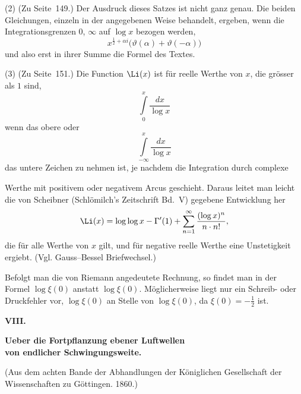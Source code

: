 \documentclass[12pt,a4paper]{book}
\theoremstyle{definition}
\theoremstyle{remark}
\begin{document}
\smallskip
\noindent (2) (Zu Seite~149.) Der Ausdruck dieses Satzes ist nicht ganz genau. Die beiden Gleichungen, einzeln in der angegebenen Weise behandelt, ergeben, wenn die Integrationsgrenzen $0$, $\infty$ auf $\log x$ bezogen werden,
\[
x^{\frac{1}{2}+\alpha i}\bigl(\vartheta(\alpha) + \vartheta(-\alpha)\bigr)
\]
und also erst in ihrer Summe die Formel des Textes.

\smallskip
\noindent (3) (Zu Seite~151.) Die Function $\Li(x)$ ist f\"ur reelle Werthe von $x$, die gr\"osser als $1$ sind,
\[
\int\limits_{0}^{x}\frac{dx}{\log x}
\]
 wenn das obere oder
\[
\int\limits_{-\infty}^{x}\frac{dx}{\log x}
\]
 das untere Zeichen zu nehmen ist, je nachdem die Integration durch complexe

Werthe mit positivem oder negativem Arcus geschieht. Daraus leitet man leicht die von Scheibner (Schl\"omilch's Zeitschrift Bd.~V) gegebene Entwicklung her
\[
\Li(x) = \log\log x - \Gamma'(1) + \sum_{n=1}^{\infty}\frac{(\log x)^{n}}{n\cdot n!},
\]
die f\"ur alle Werthe von $x$ gilt, und f\"ur negative reelle Werthe eine Unstetigkeit ergiebt. (Vgl. Gauss--Bessel Briefwechsel.)

Befolgt man die von Riemann angedeutete Rechnung, so findet man in der Formel $\log\xi(0)$ anstatt $\log\xi(0)$. M\"oglicherweise liegt nur ein Schreib- oder Druckfehler vor, $\log\xi(0)$ an Stelle von $\log\xi(0)$, da $\xi(0) = -\frac{1}{2}$ ist.



\newpage
\begin{center}
\Large\textbf{VIII.}
\end{center}
\vspace{-0.5em}
\begin{center}
\Large\textbf{Ueber die Fortpflanzung ebener Luftwellen}\\[0.3em]
\Large\textbf{von endlicher Schwingungsweite.}
\end{center}
\vspace{0.3em}
\begin{center}
\small (Aus dem achten Bande der Abhandlungen der K\"oniglichen Gesellschaft der\\
\small Wissenschaften zu G\"ottingen. 1860.)
\end{center}

\bigskip
\end{document}
